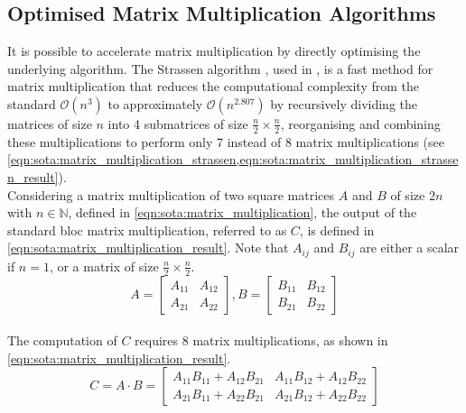 \subsection{Optimised Matrix Multiplication Algorithms}\label{sec:sota:matrix_multiplication}

It is possible to accelerate matrix multiplication by directly optimising the
underlying algorithm. The  Strassen algorithm \cite{strassen1969gaussian}, used
in \cite{DBLP:conf/icann/CongX14}, is a fast method for matrix multiplication
that reduces the computational complexity from the standard $\mathcal{O}(n^{3})$
to approximately $\mathcal{O}(n^{2.807})$ by recursively dividing the matrices
of size $n$ into 4 submatrices of size $\frac{n}{2} \times \frac{n}{2}$,
reorganising and combining these multiplications to perform only 7 instead of 8
matrix multiplications (see
\cref{eqn:sota:matrix_multiplication_strassen,eqn:sota:matrix_multiplication_strassen_result}).\\

Considering a matrix multiplication of two square matrices $A$ and $B$ of size
$2n$ with $n\in\mathbb{N}$, defined in \cref{eqn:sota:matrix_multiplication},
the output of the standard bloc matrix multiplication, referred to as $C$, is
defined in \cref{eqn:sota:matrix_multiplication_result}. Note that $A_{ij}$ and
$B_{ij}$ are either a scalar if $n=1$, or a matrix of size $\frac{n}{2} \times
\frac{n}{2}$.\\

\begin{equation}
  \label{eqn:sota:matrix_multiplication}
  A = \begin{bmatrix} A_{11} & A_{12} \\ A_{21} & A_{22} \end{bmatrix},
  B = \begin{bmatrix} B_{11} & B_{12} \\ B_{21} & B_{22} \end{bmatrix}
\end{equation}\\

\noindent The computation of $C$ requires 8 matrix multiplications, as shown in
\cref{eqn:sota:matrix_multiplication_result}.\\
\begin{equation}
  \label{eqn:sota:matrix_multiplication_result}
  C = A \cdot B = \begin{bmatrix} A_{11}B_{11} + A_{12}B_{21} & A_{11}B_{12} + A_{12}B_{22} \\ A_{21}B_{11} + A_{22}B_{21} & A_{21}B_{12} + A_{22}B_{22} \end{bmatrix}
\end{equation}\\


